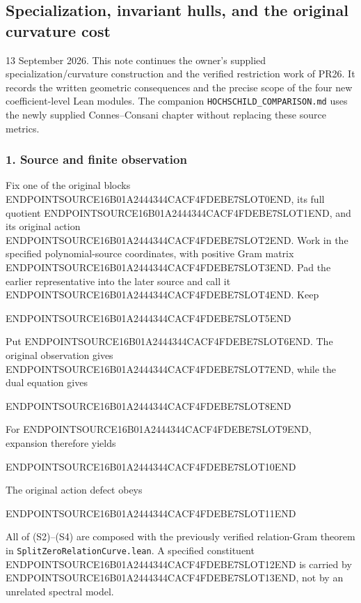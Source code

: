 \subsection{Specialization, invariant hulls, and the original curvature cost}\label{endpoint-cc_specialization--specialization-invariant-hulls-and-the-original-curvature-cost}

13 September 2026. This note continues the owner's supplied specialization/curvature construction and the verified restriction work of PR26. It records the written geometric consequences and the precise scope of the four new coefficient-level Lean modules. The companion \texttt{HOCHSCHILD\_COMPARISON.md} uses the newly supplied Connes--Consani chapter without replacing these source metrics.

\subsubsection{1. Source and finite observation}\label{endpoint-cc_specialization--source-and-finite-observation}

Fix one of the original blocks ENDPOINTSOURCE16B01A2444344CACF4FDEBE7SLOT0END, its full quotient ENDPOINTSOURCE16B01A2444344CACF4FDEBE7SLOT1END, and its original action ENDPOINTSOURCE16B01A2444344CACF4FDEBE7SLOT2END. Work in the specified polynomial-source coordinates, with positive Gram matrix ENDPOINTSOURCE16B01A2444344CACF4FDEBE7SLOT3END. Pad the earlier representative into the later source and call it ENDPOINTSOURCE16B01A2444344CACF4FDEBE7SLOT4END. Keep

ENDPOINTSOURCE16B01A2444344CACF4FDEBE7SLOT5END

Put ENDPOINTSOURCE16B01A2444344CACF4FDEBE7SLOT6END. The original observation gives ENDPOINTSOURCE16B01A2444344CACF4FDEBE7SLOT7END, while the dual equation gives

ENDPOINTSOURCE16B01A2444344CACF4FDEBE7SLOT8END

For ENDPOINTSOURCE16B01A2444344CACF4FDEBE7SLOT9END, expansion therefore yields

ENDPOINTSOURCE16B01A2444344CACF4FDEBE7SLOT10END

The original action defect obeys

ENDPOINTSOURCE16B01A2444344CACF4FDEBE7SLOT11END

All of (S2)--(S4) are composed with the previously verified relation-Gram theorem in \texttt{SplitZeroRelationCurve.lean}. A specified constituent ENDPOINTSOURCE16B01A2444344CACF4FDEBE7SLOT12END is carried by ENDPOINTSOURCE16B01A2444344CACF4FDEBE7SLOT13END, not by an unrelated spectral model.

